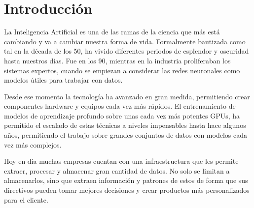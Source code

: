 \chapter{Introducción} \label{intro}




La Inteligencia Artificial es una de las ramas de la ciencia que más está cambiando y va a cambiar nuestra forma de vida. Formalmente bautizada como tal en la década de los 50, ha vivido diferentes periodos de esplendor y oscuridad hasta nuestros días. Fue en los 90, mientras en la industria proliferaban los sistemas expertos, cuando se empiezan a considerar las redes neuronales como modelos útiles para trabajar con datos.

Desde ese momento la tecnología ha avanzado en gran medida, permitiendo crear componentes hardware y equipos cada vez más rápidos. El entrenamiento de modelos de aprendizaje profundo sobre unas cada vez más potentes GPUs, ha permitido el escalado de estas técnicas a niveles impensables hasta hace algunos años, permitiendo el trabajo sobre grandes conjuntos de datos con modelos cada vez más complejos.

Hoy en día muchas empresas cuentan con una infraestructura que les permite extraer, procesar y almacenar gran cantidad de datos. No solo se limitan a almacenarlos, sino que extraen información y patrones de estos de forma que sus directivos pueden tomar mejores decisiones y crear productos más personalizados para el cliente. 

